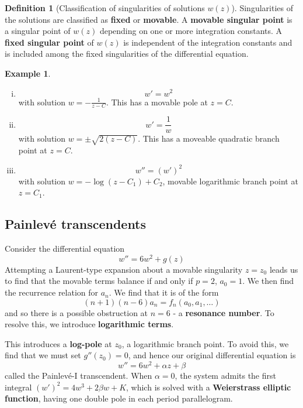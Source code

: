 \documentclass[10pt, oneside, reqno]{amsart}
\theoremstyle{plain}%
\theoremstyle{definition}
\newtheorem{defn}[thm]{Definition}
\newtheorem{exmp}[thm]{Example}
\theoremstyle{remark}
\begin{document}
\begin{defn}[Classification of singularities of solutions $w(z)$]
    Singularities of the solutions are classified as \textbf{fixed} or \textbf{movable}.  A \textbf{movable singular point} is a singular point of $w(z)$ depending on one or more integration constants. 
    A \textbf{fixed singular point} of $w(z)$ is independent of the integration constants and is included among the fixed singularities of the differential equation.
\end{defn}
    
\begin{exmp}
    \begin{enumerate}[(i)]
        \item \[
            w' = w^2
        \] with solution $w = -\frac{1}{z - C}$.  This has a movable pole at $z = C$. 
    
    \item \[
        w' = \frac{1}{w}
    \] with solution $w = \pm \sqrt{2(z-C)}$.  This has a moveable quadratic branch point at $z = C$.
    
    
    \item \[
        w'' = \left(w'\right)^2
    \] with solution $w = -\log (z - C_1) + C_2$, movable logarithmic branch point at $z = C_1$.

    
    \end{enumerate}
    
\end{exmp}

\subsection{Painlev\'e transcendents} %
\label{sec:painlev'e_transcendents}


Consider the differential equation \[
    w'' = 6 w^2 + g(z)
\]
Attempting a Laurent-type expansion about a movable singularity $z = z_0$ leads us to find that the movable terms balance if and only if $p = 2$, $a_0 = 1$.  We then find the recurrence relation for $a_n$.  We find that it is of the form \[
    (n+1)(n-6) a_n = f_n(a_0, a_1, \dots)
\] and so there is a possible obstruction at $n = 6$ - a \textbf{resonance number}.  To resolve this, we introduce \textbf{logarithmic terms}.  

This introduces a \textbf{log-pole} at $z_0$, a logarithmic branch point.  To avoid this, we find that we must set $g''(z_0) = 0$, and hence our original differential equation is \[
    w'' = 6 w^2 + \alpha z + \beta
\] called the Painlev\'e-I transcendent.  When $\alpha = 0$, the system admits the first integral $(w')^2 = 4w^3 + 2 \beta w + K$, which is solved with a \textbf{Weierstrass elliptic function}, having one double pole in each period parallelogram. 
\end{document}
